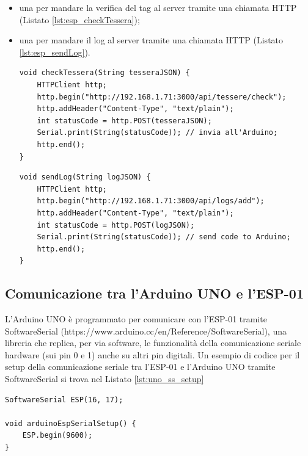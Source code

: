 \documentclass[12pt]{report}
\begin{document}
\begin{itemize}
	\item una per mandare la verifica del tag al server tramite una chiamata HTTP (Listato \ref{lst:esp_checkTessera});
	\item una per mandare il log al server tramite una chiamata HTTP (Listato \ref{lst:esp_sendLog}).
	
\begin{lstlisting}[caption={L'ESP-01 manda una richiesta POST all'endpoint specificato. Il corpo della richiesta è in formato JSON e include il seriale e il tipo della tessera che si vuole verificare.}, label={lst:esp_checkTessera}, xleftmargin=\dimexpr-\leftmargini]
void checkTessera(String tesseraJSON) {
	HTTPClient http;
	http.begin("http://192.168.1.71:3000/api/tessere/check");
	http.addHeader("Content-Type", "text/plain");
	int statusCode = http.POST(tesseraJSON);
	Serial.print(String(statusCode)); // invia all'Arduino;
	http.end();
}
\end{lstlisting}
\begin{lstlisting}[caption={L'ESP-01 manda una richiesta POST all'endpoint specificato. Il corpo della richiesta è in formato JSON e rappresenta il log.}, label={lst:esp_sendLog}, xleftmargin=\dimexpr-\leftmargini]
void sendLog(String logJSON) {
	HTTPClient http;
	http.begin("http://192.168.1.71:3000/api/logs/add");
	http.addHeader("Content-Type", "text/plain");
	int statusCode = http.POST(logJSON);
	Serial.print(String(statusCode)); // send code to Arduino;
	http.end();
}
\end{lstlisting}

\end{itemize}

\subsection{Comunicazione tra l'Arduino UNO e l'ESP-01 }\label{sec:softwareserial}

L'Arduino UNO è programmato per comunicare con l'ESP-01 tramite SoftwareSerial (https://www.arduino.cc/en/Reference/SoftwareSerial), una libreria che replica, per via software, le funzionalità della comunicazione seriale hardware (sui pin 0 e 1) anche su altri pin digitali. Un esempio di codice per il setup della comunicazione seriale tra l'ESP-01 e l'Arduino UNO tramite SoftwareSerial si trova nel Listato \ref{lst:uno_ss_setup}
\begin{lstlisting}[caption={Inizializzazione della comunicazione seriale tra Arduino UNO e ESP-01}, label={lst:uno_ss_setup}]
SoftwareSerial ESP(16, 17);

void arduinoEspSerialSetup() {
	ESP.begin(9600);
}
\end{lstlisting}
\end{document}
